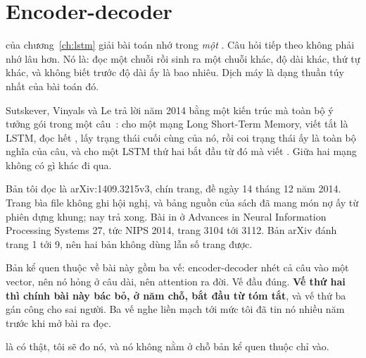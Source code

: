 \chapter{Encoder-decoder}
\label{ch:encoder-decoder}

 của chương~\ref{ch:lstm} giải bài toán nhớ trong
\emph{một} . Câu hỏi tiếp theo không phải nhớ lâu hơn. Nó
là: đọc một chuỗi rồi sinh ra một chuỗi khác, độ dài khác, thứ tự khác, và
không biết trước độ dài ấy là bao nhiêu. Dịch máy là dạng thuần túy nhất của
bài toán đó.

Sutskever, Vinyals và Le trả lời năm 2014 bằng một kiến trúc mà toàn bộ ý tưởng
gói trong một câu~\autocite{sutskever2014seq2seq}: cho một mạng Long Short-Term
Memory, viết tắt là LSTM, đọc hết , lấy trạng
thái cuối cùng của nó, rồi coi trạng thái ấy là toàn bộ nghĩa của câu, và cho
một LSTM thứ hai bắt đầu từ đó mà viết . Giữa hai
mạng không có gì khác đi qua.

Bản tôi đọc là arXiv:1409.3215v3, chín trang, đề ngày 14 tháng 12 năm 2014.
Trang bìa file không ghi hội nghị, và bảng nguồn của sách đã mang món nợ ấy từ
phiên dựng khung; nay trả xong. Bài in ở Advances in Neural Information
Processing Systems 27, tức NIPS 2014, trang 3104 tới 3112. Bản arXiv đánh trang
1 tới 9, nên hai bản không dùng lẫn số trang được.

Bản kể quen thuộc về bài này gồm ba vế: encoder-decoder nhét cả câu vào một
vector, nên nó hỏng ở câu dài, nên attention ra đời. Vế đầu đúng.
\textbf{Vế thứ hai thì chính bài này bác bỏ, ở năm chỗ, bắt đầu từ tóm tắt}, và
vế thứ ba gán công cho sai người. Ba vế nghe liền mạch tới mức tôi đã tin nó
nhiều năm trước khi mở bài ra đọc.

 là có thật, tôi sẽ đo nó, và nó không nằm ở chỗ bản
kể quen thuộc chỉ vào.









